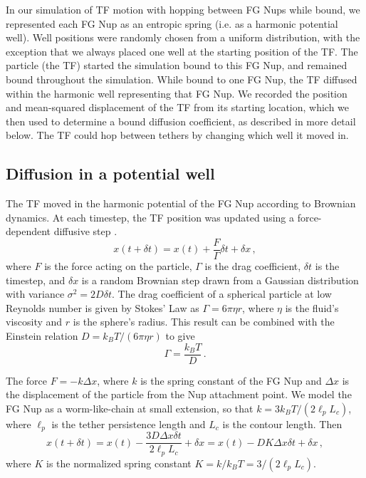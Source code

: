 In our simulation of TF motion with hopping between FG Nups while bound, we represented each FG Nup as an entropic spring (i.e. as a harmonic potential well).  Well positions were randomly chosen from a uniform distribution, with the exception that we always placed one well at the starting position of the TF.  The particle (the TF) started the simulation bound to this FG Nup, and remained bound throughout the simulation.  While bound to one FG Nup, the TF diffused within the harmonic well representing that FG Nup. We recorded the position and mean-squared displacement of the TF from its starting location, which we then used to determine a bound diffusion coefficient, as described in more detail below.  The TF could hop between tethers by changing which well it moved in.

\subsection{Diffusion in a potential well}

The TF moved in the harmonic potential of the FG Nup according to Brownian dynamics. At each timestep, the TF position was updated using a force-dependent diffusive step \cite{blackwell17}.
\begin{equation}
  x(t+\delta t) = x(t) + \frac{F}{\Gamma} \delta t + \delta x\,,
\end{equation} 
where $F$ is the force acting on the particle, $\Gamma$ is the drag coefficient, $\delta t$ is the timestep, and $\delta x$ is a random Brownian step drawn from a Gaussian distribution with variance $\sigma^2 = 2 D \delta t$. The drag coefficient of a spherical particle at low Reynolds number is given by Stokes' Law as $\Gamma = 6 \pi \eta r$, where $\eta$ is the fluid's viscosity and $r$ is the sphere's radius.  This result can be combined with the Einstein relation $D = k_B T / (6\pi \eta r)$ to give
\begin{equation}
\Gamma= \frac{k_B T}{D}\,.
\end{equation}
 
The force $F = -k\Delta x$, where $k$ is the spring constant of the FG Nup and $\Delta x$ is the displacement of the particle from the Nup attachment point.  We model the FG Nup as a worm-like-chain at small extension, so that $k = 3 k_B T/(2\ell_pL_c)$, where $\ell_p$ is the tether persistence length and $L_c$ is the contour length.  Then 
\begin{equation}
  x(t+\delta t) = x(t) - \frac{3 D \Delta x \delta t}{2\ell_p L_c }+
  \delta x = x(t) - D K \Delta x \delta t+ \delta x\,,
\end{equation}
where $K$ is the normalized spring constant $K = k/k_B T = 3/(2 \ell_p L_c)$.

